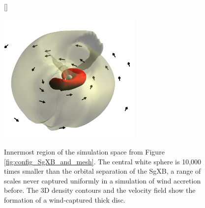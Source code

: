 \documentclass[letterpaper,12pt,onecolumn]{article}
\makeatletter
\newcommand{\sgx}{SgXB\xspace}
\newcommand*{\ns}{NS\@\xspace}
\makeatother
\begin{document}


\newpage

\begin{figure}[!h]
\vspace*{-0.3cm}
[\FBwidth]
{\caption{Innermost region of the simulation space from Figure\,\ref{fig:config_SgXB_and_mesh}. The central white sphere is 10,000 times smaller than the orbital separation of the \sgx, a range of scales never captured uniformly in a simulation of wind accretion before. The 3D density contours and the velocity field show the formation of a wind-captured thick disc.}\label{fig:disc}}
{\includegraphics[width=7cm]{Figures/disc.png}}
\vspace*{-0.4cm}
\end{figure}
\end{document}
